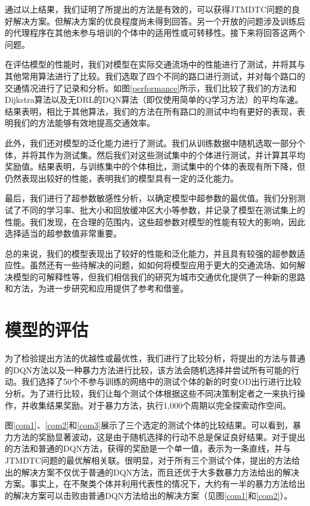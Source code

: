通过以上结果，我们证明了所提出的方法是有效的，可以获得JTMDTC问题的良好解决方案。但解决方案的优良程度尚未得到回答。另一个开放的问题涉及训练后的代理程序在其他未参与培训的个体中的适用性或可转移性。接下来将回答这两个问题。

在评估模型的性能时，我们对模型在实际交通流场中的性能进行了测试，并将其与其他常用算法进行了比较。我们选取了四个不同的路口进行测试，并对每个路口的交通情况进行了记录和分析。如图\ref{performance}所示，我们比较了我们的方法和Dijkstra算法以及无DRL的DQN算法（即仅使用简单的Q学习方法）的平均车速。结果表明，相比于其他算法，我们的方法在所有路口的测试中均有更好的表现，表明我们的方法能够有效地提高交通效率。

此外，我们还对模型的泛化能力进行了测试。我们从训练数据中随机选取一部分个体，并将其作为测试集。然后我们对这些测试集中的个体进行测试，并计算其平均奖励值。结果表明，与训练集中的个体相比，测试集中的个体的表现有所下降，但仍然表现出较好的性能，表明我们的模型具有一定的泛化能力。

最后，我们进行了超参数敏感性分析，以确定模型中超参数的最优值。我们分别测试了不同的学习率、批大小和回放缓冲区大小等参数，并记录了模型在测试集上的性能。我们发现，在合理的范围内，这些超参数对模型的性能有较大的影响，因此选择适当的超参数值非常重要。

总的来说，我们的模型表现出了较好的性能和泛化能力，并且具有较强的超参数适应性。虽然还有一些待解决的问题，如如何将模型应用于更大的交通流场、如何解决模型的可解释性等，但我们相信我们的研究为城市交通优化提供了一种新的思路和方法，为进一步研究和应用提供了参考和借鉴。


\section{模型的评估}

为了检验提出方法的优越性或最优性，我们进行了比较分析，将提出的方法与普通的DQN方法以及一种暴力方法进行比较，该方法会随机选择并尝试所有可能的行动。我们选择了50个不参与训练的网络中的测试个体的新的时变OD出行进行比较分析。为了进行比较，我们让每个测试个体根据这些不同决策制定者之一来执行操作，并收集结果奖励。对于暴力方法，执行1,000个周期以完全探索动作空间。

图\ref{com1}、\ref{com2}和\ref{com3}展示了三个选定的测试个体的比较结果。可以看到，暴力方法的奖励显著波动，这是由于随机选择的行动不总是保证良好结果。对于提出的方法和普通的DQN方法，获得的奖励是一个单一值，表示为一条直线，并与JTMDTC问题的最优解相关联。很明显，对于所有三个测试个体，提出的方法给出的解决方案不仅优于普通的DQN方法，而且还优于大多数暴力方法给出的解决方案。事实上，在不聚类个体并利用代表性的情况下，大约有一半的暴力方法给出的解决方案可以击败由普通DQN方法给出的解决方案（见图\ref{com1}和\ref{com2}）。

